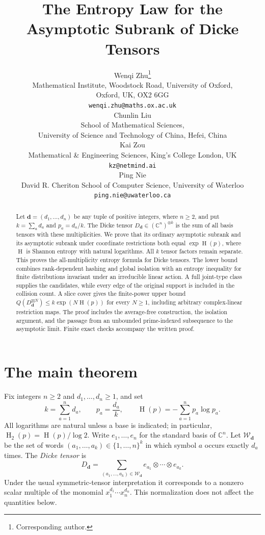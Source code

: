 \documentclass[10pt,a4paper]{article}
\title{The Entropy Law for the Asymptotic Subrank of Dicke Tensors}
\author{%
Wenqi Zhu\thanks{Corresponding author.}\\
{\small Mathematical Institute, Woodstock Road, University of Oxford,}\\
{\small Oxford, UK, OX2 6GG}\\
{\small\texttt{wenqi.zhu@maths.ox.ac.uk}}\\[1ex]
Chunlin Liu\\
{\small School of Mathematical Sciences,}\\
{\small University of Science and Technology of China, Hefei, China}\\[1ex]
Kai Zou\\
{\small Mathematical \& Engineering Sciences, King's College London, UK}\\
{\small\texttt{kz@netmind.ai}}\\[1ex]
Ping Nie\\
{\small David R. Cheriton School of Computer Science, University of Waterloo}\\
{\small\texttt{ping.nie@uwaterloo.ca}}}
\date{}
\theoremstyle{definition}
\theoremstyle{remark}
\numberwithin{equation}{section}
\newcommand{\C}{\mathbb C}
\DeclareMathOperator{\HH}{H}
\begin{document}
\maketitle
\begin{abstract}
Let $\mathbf d=(d_1,\ldots,d_n)$ be any tuple of positive integers,
where $n\geq2$, and put $k=\sum_a d_a$ and $p_a=d_a/k$.
The Dicke tensor $D_{\mathbf d}\in(\C^n)^{\otimes k}$ is the sum of
all basis tensors with these multiplicities. We prove that its ordinary
asymptotic subrank and its asymptotic subrank under coordinate restrictions
both equal $\exp\HH(p)$, where $\HH$ is Shannon entropy with natural
logarithms. All $k$ tensor factors remain separate. This proves the
all-multiplicity entropy formula for Dicke tensors. The lower bound
combines rank-dependent hashing and global isolation with an entropy
inequality for finite distributions invariant under an irreducible
linear action. A full joint-type class supplies the candidates, while
every edge of the original support is included in the collision count.
A slice cover gives the finite-power upper bound
$Q(D_{\mathbf d}^{\boxtimes N})\leq k\exp(N\HH(p))$ for every
$N\geq1$, including arbitrary complex-linear restriction maps.
The proof includes the average-free construction, the isolation argument,
and the passage from an unbounded prime-indexed subsequence to the
asymptotic limit. Finite exact checks accompany the written proof.
\end{abstract}

\section{The main theorem}\label{sec:main}

Fix integers $n\geq2$ and $d_1,\ldots,d_n\geq1$, and set
\[
 k=\sum_{a=1}^n d_a,\qquad
 p_a=\frac{d_a}{k},\qquad
 \HH(p)=-\sum_{a=1}^n p_a\log p_a.
\]
All logarithms are natural unless a base is indicated; in particular,
$\HH_2(p)=\HH(p)/\log2$. Write $e_1,\ldots,e_n$ for the standard
basis of $\C^n$. Let $\mathcal W_{\mathbf d}$ be the set of words
$(a_1,\ldots,a_k)\in\{1,\ldots,n\}^k$ in which symbol $a$ occurs
exactly $d_a$ times. The \emph{Dicke tensor} is
\begin{equation}\label{eq:dicke}
 D_{\mathbf d}
   =\sum_{(a_1,\ldots,a_k)\in\mathcal W_{\mathbf d}}
        e_{a_1}\otimes\cdots\otimes e_{a_k}.
\end{equation}
Under the usual symmetric-tensor interpretation it corresponds to a
nonzero scalar multiple of the monomial $x_1^{d_1}\cdots x_n^{d_n}$.
This normalization does not affect the quantities below.
\end{document}
